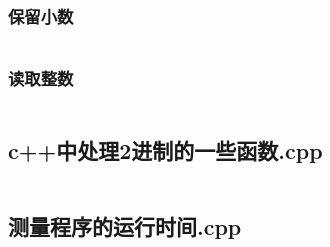 \documentclass{article}
\begin{document}
\subsubsection{保留小数}
\inputminted{c++}{/home/zzuzxy/t2/Template1.0/6 其它/IO/保留小数.cpp}
\subsubsection{读取整数}
\inputminted{c++}{/home/zzuzxy/t2/Template1.0/6 其它/IO/读取整数.cpp}
\subsection{c++中处理2进制的一些函数.cpp}
\inputminted{c++}{/home/zzuzxy/t2/Template1.0/6 其它/c++中处理2进制的一些函数.cpp}
\subsection{测量程序的运行时间.cpp}
\inputminted{c++}{/home/zzuzxy/t2/Template1.0/6 其它/测量程序的运行时间.cpp}
\end{document}

